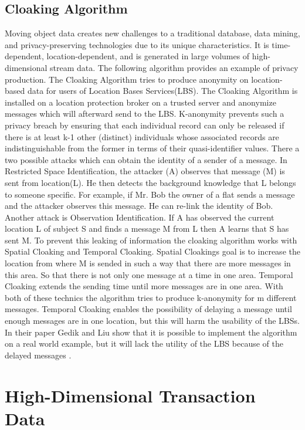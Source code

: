 \documentclass{llncs}
\begin{document}
\subsection{Cloaking Algorithm}
Moving object data creates new challenges to a traditional database, data mining, and privacy-preserving technologies due to its unique characteristics. It is time-dependent, location-dependent, and is generated in large volumes of high-dimensional stream data. The following algorithm provides an example of privacy production. The Cloaking Algorithm tries to produce anonymity on location-based data for users of Location Bases Services(LBS). The Cloaking Algorithm is installed on a location protection broker on a trusted server and anonymize messages which will afterward send to the LBS. K-anonymity prevents such a privacy breach by ensuring that each individual record can only be released if there is at least k-1 other (distinct) individuals whose associated records are indistinguishable from the former in terms of their quasi-identifier values. There a two possible attacks which can obtain  the identity of a sender of a message. In  Restricted Space Identification, the attacker (A) observes that message (M) is sent from location(L). He then detects the background knowledge that L belongs to someone specific. For example, if Mr. Bob the owner of a flat sends a message and the attacker observes this message. He can re-link the identity of Bob. Another attack is  Observation Identiﬁcation. If A has observed the current location L of subject S and ﬁnds a message M from L then A learns that S has sent M. To prevent this leaking of information the cloaking algorithm works with Spatial Cloaking and Temporal Cloaking. Spatial Cloakings goal is to increase the location from where M is sended in such a way that there are more messages in this area. So that there is not only one message at a time in one area. Temporal Cloaking extends the sending time until more messages are in one area. With both of these technics the algorithm tries to produce k-anonymity for m different messages. Temporal Cloaking enables the possibility of delaying a message until enough messages are in one location, but this will harm the usability of the LBSs. In their paper Gedik and Liu show that it is possible to implement the algorithm on a real world example, but it will lack the utility of the LBS because of the delayed messages \cite{gedik2004customizable}.



\section{High-Dimensional Transaction Data}
\end{document}
